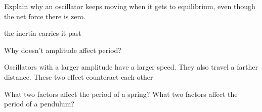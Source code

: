 \documentclass[10pt]{exam}
\begin{document}
\begin{questions}

\question 
  Explain why an oscillator keeps moving when it gets to equilibrium, even though the net force there is zero.

  \begin{solution}[\stretch{2}]
    the inertia carries it past
  \end{solution}

\question
  Why doesn't amplitude affect period?

  \begin{solution}[\stretch{2}]
    Oscillators with a larger amplitude have a larger speed.  They also travel a farther distance.  These two effect counteract each other
  \end{solution}

\question 
  What two factors affect the period of a spring?  What two factors affect the period of a pendulum?


\end{questions}
\end{document}
